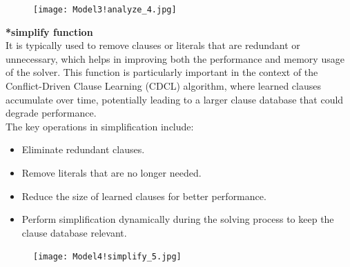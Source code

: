 \documentclass[runningheads]{llncs}
\begin{document}
 \begin{figure}[h] 
    \centering
    \texttt{[image: Model3!analyze\_4.jpg]} 
    \label{fig:sample}
\end{figure}
\newpage
\textbf{*simplify function}
\\
 It is typically used to remove clauses or literals that are redundant or unnecessary, which helps in improving both the performance and memory usage of the solver. This function is particularly important in the context of the Conflict-Driven Clause Learning (CDCL) algorithm, where learned clauses accumulate over time, potentially leading to a larger clause database that could degrade performance.\cite{minisatgit}
 \\
 The key operations in simplification include:
 \begin{itemize}
     \item Eliminate redundant clauses.
    \item Remove literals that are no longer needed.
    \item Reduce the size of learned clauses for better performance.
    \item Perform simplification dynamically during the solving process to keep the clause database relevant.
 \end{itemize}
  \begin{figure}[h] 
    \centering
    \texttt{[image: Model4!simplify\_5.jpg]} 
    \label{fig:sample}
\end{figure}
\newpage
\end{document}
